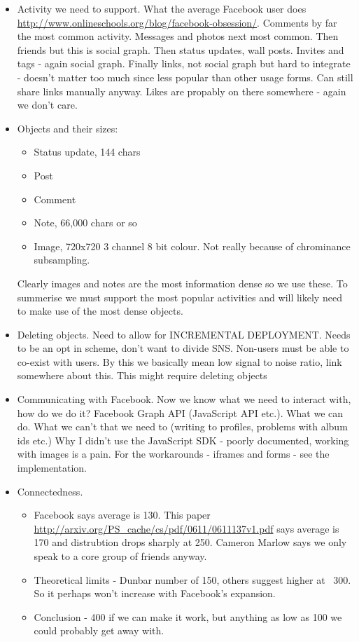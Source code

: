 \begin{itemize}
   
    \item Activity we need to support. What the average Facebook user does \url{http://www.onlineschools.org/blog/facebook-obsession/}. Comments by far the most common activity. Messages and photos next most common. Then friends  but this is social graph. Then status updates, wall posts. Invites and tags - again social graph. Finally links, not social graph but hard to integrate - doesn't matter too much since less popular than other usage forms. Can still share links manually anyway. Likes are propably on there somewhere - again we don't care.
    
    \item Objects and their sizes:
    \begin{itemize}
        \item Status update, 144 chars
        \item Post
        \item Comment
        \item Note, 66,000 chars or so
        \item Image, 720x720 3 channel 8 bit colour. Not really because of chrominance subsampling.
    \end{itemize}
    Clearly images and notes are the most information dense so we use these. To summerise we must support the most popular activities and will likely need to make use of the most dense objects.
    
    \item Deleting objects. Need to allow for INCREMENTAL DEPLOYMENT. Needs to be an opt in scheme, don't want to divide SNS. Non-users must be able to co-exist with users. By this we basically mean low signal to noise ratio, link somewhere about this. This might require deleting objects
    
    \item Communicating with Facebook. Now we know what we need to interact with, how do we do it? Facebook Graph API (JavaScript API etc.). What we can do. What we can't that we need to (writing to profiles, problems with album ids etc.) Why I didn't use the JavaScript SDK - poorly documented, working with images is a pain. For the workarounds - iframes and forms - see the implementation.
    
    \item Connectedness.
    \begin{itemize}
        \item Facebook says average is 130. This paper \url{http://arxiv.org/PS_cache/cs/pdf/0611/0611137v1.pdf} says average is 170 and distrubtion drops sharply at 250. Cameron Marlow says we only speak to a core group of friends anyway.
        \item Theoretical limits - Dunbar number of 150, others suggest higher at ~300. So it perhaps won't increase with Facebook's expansion.
        \item Conclusion - 400 if we can make it work, but anything as low as 100 we could probably get away with.
    \end{itemize}


\end{itemize}
